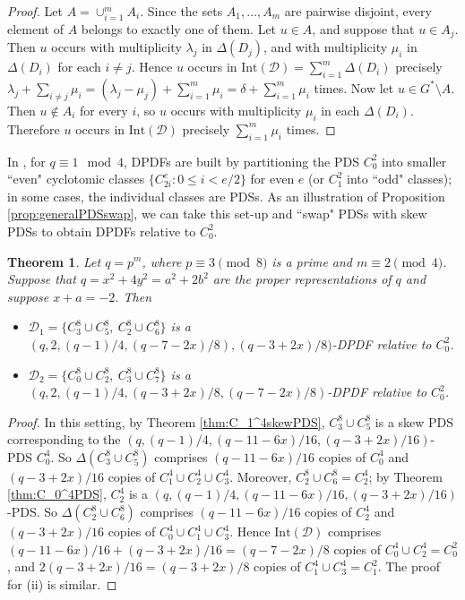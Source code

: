 \documentclass[12pt, a4paper]{article}
\newtheorem{theorem}{Theorem}[section]
\theoremstyle{definition}
\begin{document}
\begin{proof}
	Let
	$
	A=\cup_{i=1}^m A_i.
	$	Since the sets $A_1,\ldots,A_m$ are pairwise disjoint, every element of
	$A$ belongs to exactly one of them. Let $u\in A$, and suppose that $u\in A_j$. Then $u$ occurs with
	multiplicity $\lambda_j$ in $\Delta(D_j)$, and with multiplicity
	$\mu_i$ in $\Delta(D_i)$ for each $i\neq j$. Hence $u$ occurs in
	$
	\mathrm{Int}(\mathcal D)=\sum_{i=1}^m\Delta(D_i)
	$
	precisely
	$
	\lambda_j+\sum_{i\neq j}\mu_i
	=
	(\lambda_j-\mu_j)+\sum_{i=1}^m\mu_i
	=
	\delta+\sum_{i=1}^m\mu_i
	$
	times.  
	Now let $u\in G^*\setminus A$. Then $u\notin A_i$ for every $i$, so
	$u$ occurs with multiplicity $\mu_i$ in each $\Delta(D_i)$. Therefore
	$u$ occurs in $\mathrm{Int}(\mathcal D)$ precisely
	$
	\sum_{i=1}^m\mu_i
	$ 
	times. 
\end{proof}

In \cite{HucJoh}, for $q \equiv 1 \mod 4$, DPDFs are built by partitioning the PDS $C_0^2$ into smaller ``even" cyclotomic classes $\{C_{2i}^e: 0\leq i<e/2\}$ for even $e$ (or $C_1^2$ into ``odd" classes); in some cases, the individual classes are PDSs.  As an illustration of Proposition \ref{prop:generalPDSswap}, we can take this set-up and ``swap" PDSs with skew PDSs to obtain DPDFs relative to $C_0^2$.

\begin{theorem}\label{thm:DPDF0237}
Let $q=p^m$, where $p\equiv 3\pmod 8$ is a prime and $m\equiv 2\pmod 4$.
Suppose that $q=x^2+4y^2=a^2+2b^2$ are the proper representations of $q$ and suppose $x+a=-2$.  Then
\begin{itemize}
\item[(i)]  $\mathcal D_1=\{C_3^8\cup C_5^8,\ C_2^8\cup C_6^8\}$ is a $(q,2,(q-1)/4,(q-7-2x)/8),(q-3+2x)/8)$-DPDF
	relative to $C_0^2$.
\item[(ii)] $\mathcal D_2=\{C_0^8\cup C_2^8,\ C_3^8\cup C_7^8\}$ is a $(q,2,(q-1)/4,(q-3+2x)/8,(q-7-2x)/8)$-DPDF
	relative to $C_0^2$.
\end{itemize}
\end{theorem}
\begin{proof}
In this setting, by Theorem \ref{thm:C_1^4skewPDS}, $C_3^8 \cup C_5^8$ is a skew PDS corresponding to the $(q,(q-1)/4,(q-11-6x)/16,(q-3+2x)/16)$-PDS $C_0^4$. So $\Delta(C_3^8 \cup C_5^8)$ comprises $(q-11-6x)/16$ copies of $C_0^4$ and $(q-3+2x)/16$ copies of $C_1^4 \cup C_2^4 \cup C_3^4$. Moreover, $C_2^8 \cup C_6^8=C_2^4$; by Theorem \ref{thm:C_0^4PDS}, $C_2^4$ is a  $(q,(q-1)/4,(q-11-6x)/16,(q-3+2x)/16)$-PDS. So $\Delta(C_2^8 \cup C_6^8)$ comprises $(q-11-6x)/16$ copies of $C_2^4$ and $(q-3+2x)/16$ copies of $C_0^4 \cup C_1^4 \cup C_3^4$.  Hence $\mathrm{Int}(\mathcal{D})$ comprises $(q-11-6x)/16 + (q-3+2x)/16=(q-7-2x)/8$ copies of $C_0^4 \cup C_2^4=C_0^2$, and $2(q-3+2x)/16=(q-3+2x)/8$ copies
of $C_1^4 \cup C_3^4=C_1^2$.
The proof for (ii) is similar.
\end{proof}
\end{document}
